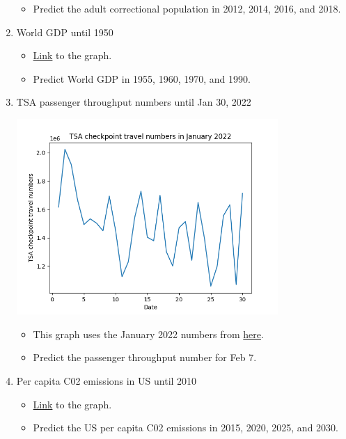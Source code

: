 \documentclass[11pt]{article}
\begin{document}
\begin{enumerate}
	\begin{itemize}
		\item Predict the adult correctional population in 2012, 2014, 2016, and 2018.
	\end{itemize}
	
	\item World GDP until 1950
	\begin{itemize}
		\item \href{https://ourworldindata.org/grapher/world-gdp-over-the-last-two-millennia?time=1..1950}{Link} to the graph.
		\item Predict World GDP in 1955, 1960, 1970, and 1990.
	\end{itemize}
	
	\item TSA passenger throughput numbers until Jan 30, 2022

	\begin{center}	
		\includegraphics[width = 375px]{tsa_checkpoint.png}
	\end{center}

	\begin{itemize}
		\item This graph uses the January 2022 numbers from \href{https://www.tsa.gov/coronavirus/passenger-throughput}{here}.
		\item Predict the passenger throughput number for Feb 7.
	\end{itemize}
	
	\item Per capita C02 emissions in US until 2010
	\begin{itemize}
		\item \href{https://ourworldindata.org/grapher/co-emissions-per-capita?tab=chart&time=1750..2010&country=~USA}{Link} to the graph.
		\item Predict the US per capita C02 emissions in 2015, 2020, 2025, and 2030.
	\end{itemize}
	

\end{enumerate}
\end{document}
